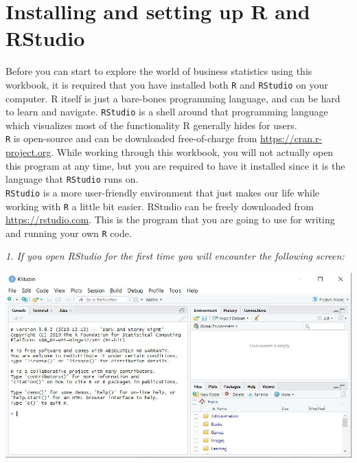 \section{Installing and setting up R and RStudio}

Before you can start to explore the world of business statistics using this workbook, it is required that you have installed both \texttt{R} and \texttt{RStudio} on your computer. R itself is just a bare-bones programming language, and can be hard to learn and navigate. \texttt{RStudio} is a shell around that programming language which visualizes most of the functionality R generally hides for users.\\

\texttt{R} is open-source and can be downloaded free-of-charge from \url{https://cran.r-project.org}. While working through this workbook, you will not actually open this program at any time, but you are required to have it installed since it is the language that \texttt{RStudio} runs on. \\

\texttt{RStudio} is a more user-friendly environment that just makes our life while working with \texttt{R} a little bit easier. RStudio can be freely downloaded from \url{https://rstudio.com}. This is the program that you are going to use for writing and running your own \texttt{R} code. \\

\vspace*{1cm}

\begin{minipage}{0.4\textwidth}
\textit{1. If you open RStudio for the first
time you will encounter the
following screen:}
\end{minipage}%
\hfill%
\begin{minipage}{0.55\textwidth}
\includegraphics[width=\linewidth]{Files/Images/setup1.jpg}
\end{minipage} \\
\\
\bigskip

